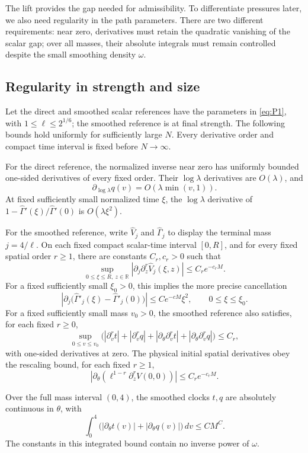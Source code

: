 The lift provides the gap needed for admissibility. To differentiate
pressures later, we also need regularity in the path parameters.
There are two different requirements: near zero, derivatives must retain
the quadratic vanishing of the scalar gap; over all masses, their
absolute integrals must remain controlled despite the small smoothing
density \(\omega\).

\subsection{Regularity in strength and size}

\begin{lemma}
\label{paths:parameter-regularity}
Let the direct and smoothed scalar references have the parameters in
\eqref{eq:P1}, with \(1\le\ell\le2^{1/6}\); the smoothed reference
is at final strength. The following bounds hold uniformly for sufficiently
large \(N\). Every derivative order and compact time interval is fixed
before \(N\to\infty\).

For the direct reference, the normalized inverse near zero has uniformly
bounded one-sided derivatives of every fixed order. Their
\(\log\lambda\) derivatives are \(O(\lambda)\), and
\[
 \partial_{\log\lambda}q(v)=O(\lambda\min(v,1)).
\]
At fixed sufficiently small normalized time \(\xi\), the
\(\log\lambda\) derivative of
\(1-\widehat\Gamma'(\xi)/\widehat\Gamma'(0)\) is
\(O(\lambda\xi^2)\).

For the smoothed reference, write \(\widehat V_j\) and
\(\widehat\Gamma_j\) to display the terminal mass \(j=4/\ell\).
On each fixed compact scalar-time interval \([0,R]\), and for every
fixed spatial order \(r\ge1\), there are constants \(C_r,c_r>0\)
such that
\[
 \sup_{0\le\xi\le R,\ z\in\mathbb R}
 \left|\partial_j\partial_z^r\widehat V_j(\xi,z)\right|
 \le C_r e^{-c_rM}.
\]
For a fixed sufficiently small \(\xi_0>0\), this implies the more
precise cancellation
\[
 \left|\partial_j\bigl(
       \widehat\Gamma'_j(\xi)-\widehat\Gamma'_j(0)\bigr)\right|
 \le C e^{-cM}\xi^2,
 \qquad 0\le\xi\le\xi_0.                              \tag{P2a}\label{eq:P2a}
\]
For a fixed sufficiently small mass \(v_0>0\), the smoothed reference
also satisfies, for each fixed \(r\ge0\),
\[
 \sup_{0\le v\le v_0}
 \bigl(|\partial_v^r t|+|\partial_v^r q|
       +|\partial_\theta\partial_v^r t|
       +|\partial_\theta\partial_v^r q|\bigr)\le C_r,
\]
with one-sided derivatives at zero. The physical initial spatial
derivatives obey the rescaling bound, for each fixed \(r\ge1\),
\[
 \left|\partial_\theta\left(
     \ell^{1-r}\partial_z^r V(0,0)\right)\right|
 \le C_r e^{-c_rM}.
\]

Over the full mass interval \((0,4)\), the smoothed clocks \(t,q\)
are absolutely continuous in \(\theta\), with
\[
 \int_0^4\bigl(|\partial_\theta t(v)|
                  +|\partial_\theta q(v)|\bigr)\,dv
 \le C M^C.                                            \tag{P2b}\label{eq:P2b}
\]
The constants in this integrated bound contain no inverse power of
\(\omega\).
\end{lemma}


